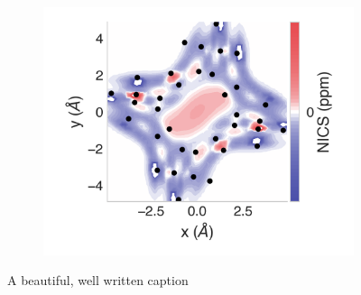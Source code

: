 \documentclass[
	fontsize=10pt, %
	twoside=true, %
	numbers=noenddot, %
]{kaobook}
\begin{document}
\begin{figure}[h]
\begin{subfigure}{5.5cm}\centering\includegraphics{as12-2d}\end{subfigure}
\caption[short]{A beautiful, well written caption}
\end{figure}

\newpage
\end{document}
